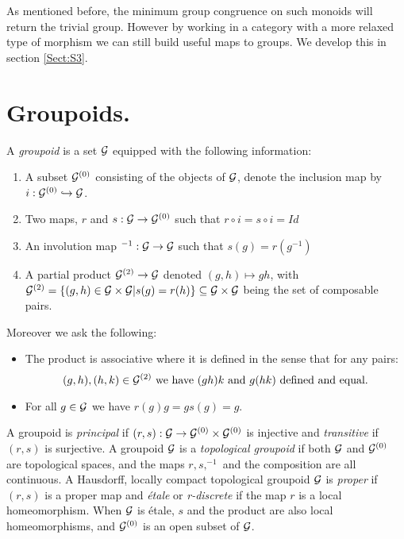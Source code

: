 As mentioned before, the minimum group congruence on such monoids will return the trivial group. However by working in a category with a more relaxed type of morphism we can still build useful maps to groups. We develop this in section \ref{Sect:S3}.

\section{Groupoids.}

\begin{definition}\label{def:grpoid2}
A \textit{groupoid} is a set $\mathcal{G}$ equipped with the following information:
\begin{enumerate}
\item A subset $\mathcal{G}^{(0)}$ consisting of the objects of $\mathcal{G}$, denote the inclusion map by $i: \mathcal{G}^{(0)}\hookrightarrow \mathcal{G}$. 
\item Two maps, $r$ and $s: \mathcal{G}  \rightarrow \mathcal{G}^{(0)}$ such that $r\circ i = s \circ i = Id$ 
\item An involution map $^{-1}:\mathcal{G} \rightarrow \mathcal{G}$ such that $s(g)=r(g^{-1})$
\item A partial product $\mathcal{G}^{(2)} \rightarrow \mathcal{G}$ denoted $(g,h) \mapsto gh$, with $\mathcal{G}^{(2)}=\lbrace (g,h) \in \mathcal{G} \times \mathcal{G} | s(g)=r(h) \rbrace\subseteq \mathcal{G}\times \mathcal{G}$ being the set of composable pairs.
\end{enumerate}
Moreover we ask the following:
\begin{itemize}
\item The product is associative where it is defined in the sense that for any pairs: 
\begin{equation*}
(g,h),(h,k)\in \mathcal{G}^{(2)} \mbox{ we have }(gh)k \mbox{ and } g(hk) \mbox{ defined and equal}.
\end{equation*}
\item For all $g \in \mathcal{G}$ we have $r(g)g=gs(g)=g$.
\end{itemize}
\end{definition}

A groupoid is \textit{principal} if $(r,s): \mathcal{G} \rightarrow \mathcal{G}^{(0)} \times \mathcal{G}^{(0)}$ is injective and \textit{transitive} if $(r,s)$ is surjective. A groupoid $\mathcal{G}$ is a \textit{topological groupoid} if both $\mathcal{G}$ and $\mathcal{G}^{(0)}$ are topological spaces, and the maps $r,s, ^{-1}$ and the composition are all continuous. A Hausdorff, locally compact topological groupoid $\mathcal{G}$ is \textit{proper} if $(r,s)$ is a proper map and \textit{\'etale} or \textit{r-discrete} if the map $r$ is a local homeomorphism. When $\mathcal{G}$ is \'etale, $s$ and the product are also local homeomorphisms, and $\mathcal{G}^{(0)}$ is an open subset of $\mathcal{G}$.

